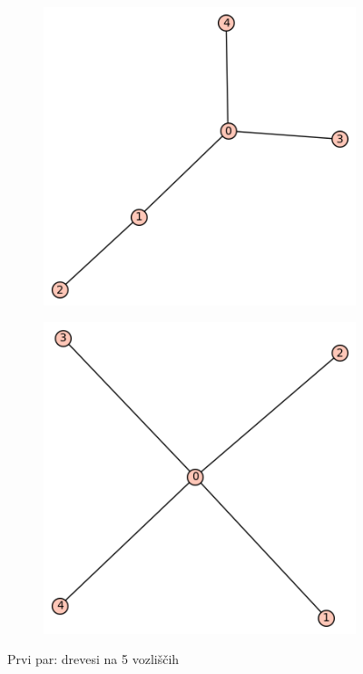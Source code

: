\documentclass[12pt, a4paper]{article}
\begin{document}
\begin{center}
\begin{figure}[!htb]
\centering
\begin{subfigure}{0.5\textwidth}
  \centering
  \includegraphics[width=0.4\linewidth]{t-6}
\end{subfigure}%
\begin{subfigure}{0.5\textwidth}
  \centering
  \includegraphics[width=0.4\linewidth]{t-7}
\end{subfigure}
\caption{Prvi par: drevesi na 5 vozliščih}
\label{fig:test}
\end{figure}
\end{center}
\clearpage
\end{document}
